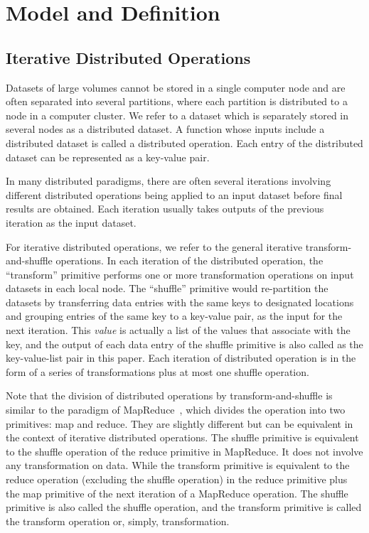 \documentclass[10pt,journal,compsoc]{IEEEtran}
\begin{document}
\section{Model and Definition}\label{section:background}
\subsection{Iterative Distributed Operations}
Datasets of large volumes cannot be stored in a single computer node
and are often separated into several partitions, 
where each partition is distributed to a node in a computer cluster. 
We refer to a dataset which is separately stored in several nodes as a distributed dataset. 
A function whose inputs include a distributed dataset is called a distributed operation.
Each entry of the distributed dataset can be represented as a key-value pair. 

In many distributed paradigms, there are often several
iterations involving different distributed operations being applied
to an input dataset before final results are obtained. 
Each iteration usually takes outputs of the previous iteration as
the input dataset. 

For iterative distributed
operations, we refer to the general iterative transform-and-shuffle operations. 
In each iteration of the distributed operation, 
the ``transform'' primitive performs one or more transformation operations on 
input datasets in each local node.
The ``shuffle'' primitive would
re-partition the datasets by transferring data entries with
the same keys to designated locations and grouping entries of the same key to a key-value pair, as the input for the next iteration. 
This \textit{value} is actually a list of the values that associate with the key, 
and the output of each data entry of the shuffle primitive is also called as the key-value-list pair in this paper.
Each iteration of distributed operation is in the form of a series of transformations plus at most one shuffle operation.

Note that the division of distributed operations by transform-and-shuffle is similar to the paradigm of 
MapReduce~\cite{dean2008mapreduce}, which divides the operation into two primitives: map and reduce.
They are slightly different but can be equivalent in the context of iterative distributed operations.  
The shuffle primitive is equivalent to the shuffle operation of the reduce primitive in MapReduce. 
It does not involve any transformation on data.
While the transform primitive is equivalent to the reduce operation
(excluding the shuffle operation) in the reduce primitive plus the map primitive of the next iteration of a MapReduce operation. 
The shuffle primitive is also called the shuffle operation,
and the transform primitive is called the transform operation or, simply, 
transformation.
\end{document}
